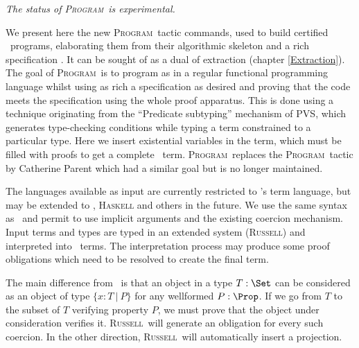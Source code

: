 \def\Program{\textsc{Program}}
\def\Russell{\textsc{Russell}}
\def\PVS{\textsc{PVS}}

\achapter{\Program{}}
\label{Program}

\begin{flushleft}
  \em The status of \Program\ is experimental.
\end{flushleft}

We present here the new \Program\ tactic commands, used to build certified
\Coq\ programs, elaborating them from their algorithmic skeleton and a
rich specification \cite{Sozeau06}. It can be sought of as a dual of extraction
(chapter \ref{Extraction}). The goal of \Program~is to program as in a regular
functional programming language whilst using as rich a specification as 
desired and proving that the code meets the specification using the whole \Coq{} proof
apparatus. This is done using a technique originating from the
``Predicate subtyping'' mechanism of \PVS \cite{Rushby98}, which generates type-checking
conditions while typing a term constrained to a particular type. 
Here we insert existential variables in the term, which must be filled
with proofs to get a complete \Coq\ term. \Program\ replaces the
\Program\ tactic by Catherine Parent \cite{Parent95b} which had a similar goal but is no longer
maintained.

The languages available as input are currently restricted to \Coq's term
language, but may be extended to \ocaml{}, \textsc{Haskell} and others
in the future. We use the same syntax as \Coq\ and permit to use implicit
arguments and the existing coercion mechanism.
Input terms and types are typed in an extended system (\Russell) and
interpreted into \Coq\ terms. The interpretation process may produce
some proof obligations which need to be resolved to create the final term.

The main difference from \Coq\ is that an object in a type $T : \Set$
can be considered as an object of type $\{ x : T~|~P\}$ for any
wellformed $P : \Prop$. 
If we go from $T$ to the subset of $T$ verifying property $P$, we must
prove that the object under consideration verifies it. \Russell\ will
generate an obligation for every such coercion. In the other direction,
\Russell\ will automatically insert a projection.

